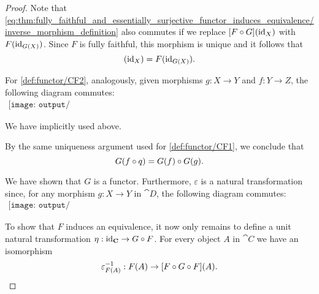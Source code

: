\begin{proof}
  Note that \eqref{eq:thm:fully_faithful_and_essentially_surjective_functor_induces_equivalence/inverse_morphism_definition} also commutes if we replace \( [F \bincirc G](\id_X) \) with \( F(\operatorname{id}_{G(X)}) \). Since \( F \) is fully faithful, this morphism is unique and it follows that
  \begin{equation*}
    [F \bincirc G](\id_X) = F(\id_{G(X)}).
  \end{equation*}

  For \ref{def:functor/CF2}, analogously, given morphisms \( g: X \to Y \) and \( f: Y \to Z \), the following diagram commutes:
  \begin{equation}\label{eq:thm:fully_faithful_and_essentially_surjective_functor_induces_equivalence/composition}
    \begin{aligned}
      \texttt{[image: output/thm\_\_fully\_faithful\_and\_essentially\_surjective\_functor\_induces\_equivalence.pdf]}
    \end{aligned}
  \end{equation}

  We have implicitly used  above.

  By the same uniqueness argument used for \ref{def:functor/CF1}, we conclude that
  \begin{equation*}
    G(f \bincirc q) = G(f) \bincirc G(g).
  \end{equation*}

  We have shown that \( G \) is a functor. Furthermore, \( \varepsilon \) is a natural transformation since, for any morphism \( g: X \to Y \) in \( \cat{D} \), the following diagram commutes:
  \begin{equation}\label{eq:thm:fully_faithful_and_essentially_surjective_functor_induces_equivalence/varepsilon}
    \begin{aligned}
      \texttt{[image: output/thm\_\_fully\_faithful\_and\_essentially\_surjective\_functor\_induces\_equivalence.pdf]}
    \end{aligned}
  \end{equation}

  To show that \( F \) induces an equivalence, it now only remains to define a unit natural transformation \( \eta: \id_{\cat{C}} \to G \bincirc F \). For every object \( A \) in \( \cat{C} \) we have an isomorphism
  \begin{equation*}
    \varepsilon_{F(A)}^{-1}: F(A) \to [F \bincirc G \bincirc F](A).
  \end{equation*}


\end{proof}
